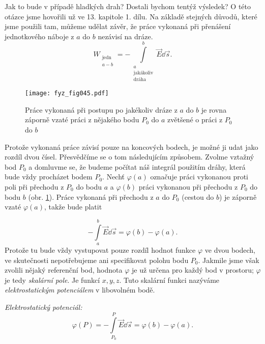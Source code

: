 {    Jak to bude v případě hladkých drah? Dostali bychom tentýž výsledek? O této otázce jsme 
    hovořili už ve 13. kapitole 1. dílu. Na základě stejných důvodů, které jsme použili tam, můžeme 
    udělat závěr, že práce vykonaná při přenášení jednotkového náboje z \(a\) do \(b\) nezávisí na 
    dráze.   
    \begin{equation*}
      W_{\substack{\text{jedn}\\ a-b}} = 
       - \int\limits_{\substack{a\\\text{jakákoliv}\\\text{dráha}}}^b\vec{E}\dd{\vec{s}}.
    \end{equation*}      

    \begin{figure}[ht!]  %
      \centering
      \texttt{[image: fyz\_fig045.pdf]}
      \caption{Práce vykonaná při postupu po jakékoliv dráze z \(a\) do \(b\) je rovna záporně     
        vzaté práci z nějakého bodu \(P_0\) do \(a\) zvětšené o práci z \(P_0\) do \(b\)}
      \label{fyz:fig045}
    \end{figure}
    Protože vykonaná práce závisí pouze na koncových bodech, je možné ji udat jako rozdíl dvou 
    čísel. Přesvědčíme se o tom následujícím způsobem. Zvolme vztažný bod \(P_0\) a domluvme se, že 
    budeme počítat náš integrál použitím dráhy, která bude vždy procházet bodem \(P_0\). Nechť 
    \(\varphi(a)\) označuje práci vykonanou proti poli při přechodu z \(P_0\) do bodu \(a\) a 
    \(\varphi(b)\) práci vykonanou při přechodu z \(P_0\) do bodu \(b\) (obr. 
    \ref{fyz:fig045}). Práce vykonaná při přechodu z \(a\) do \(P_0\) (cestou do \(b\)) 
    je záporně vzaté \(\varphi(a)\), takže bude platit

    \begin{equation}\label{fyz:fey_eq_elstat21}
     - \int\limits_{a}^{b}\vec{E}\dd{\vec{s}} = \varphi(b) - \varphi(a). 
    \end{equation}
    Protože tu bude vždy vystupovat pouze rozdíl hodnot funkce \(\varphi\) ve dvou bodech, ve 
    skutečnosti nepotřebujeme ani specifikovat polohu bodu \(P_0\). Jakmile jsme však zvolili 
    nějaký referenční bod, hodnota \(\varphi\) je už určena pro každý bod v prostoru; \(\varphi\) 
    je tedy \emph{skalární pole}. Je funkcí \(x, y, z\). Tuto skalární funkci nazýváme 
    \emph{elektrostatickým potenciálem} v libovolném bodě.

    \emph{Elektrostatický potenciál:}
     \begin{equation}\label{fyz:fey_eq_elstat22}
       \varphi(P) = - \int\limits_{P_0}^{P}\vec{E}\dd{\vec{s}} = \varphi(b) - \varphi(a). 
     \end{equation} 
    
}
